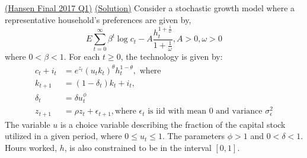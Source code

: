 \documentclass[answers]{exam}
\begin{document}
\begin{questions}
    \question \href{https://drive.google.com/drive/folders/1UWwY7p_JSQYuK9Ux_qW2YtpXHbVJyX4T}{(Hansen Final 2017 Q1)} \href{https://drive.google.com/file/d/1mlICFZK5ci4eUi5QhH7ZqUfNSqtUGcTc/view}{(Solution)} Consider a stochastic growth model where a representative household's preferences are given by,
    $$E \sum_{t=0}^{\infty} \beta^t {\log{c_t} - A \frac{h_t^{1+\frac{1}{\omega}}}{1+ \frac{1}{\omega}}}, A> 0, \omega > 0$$
    where $0 < \beta < 1$. For each $t \geq 0$, the technology is given by:
    \begin{align*}
        c_t + i_t &= e^{z_t} (u_t k_t)^{\theta} h_t^{1-\theta}, \text{ where}\\
        k_{t+1} &= (1-\delta_t) k_t + i_t,\\
        \delta_t &= \delta u_t^\phi\\
        z_{t+1} &= \rho z_t + \epsilon_{t+1}, \text{where $\epsilon_{t}$ is iid with mean 0 and variance $\sigma_{\epsilon}^2$}
    \end{align*}
    The variable $u$ is a choice variable describing the fraction of the capital stock utilized in a given period, where $0 \leq u_t \leq 1$. The parameters $\phi > 1$ and $0 < \delta < 1$. Hours worked, $h$, is also constrained to be in the interval $[0,1]$.
    \begin{parts}

\end{parts}
\end{questions}
\end{document}
